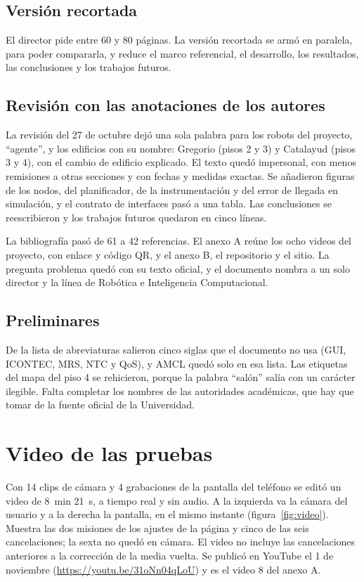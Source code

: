 \documentclass[12pt,letterpaper]{article}
\begin{document}
\subsection{Versión recortada}

El director pide entre 60 y 80 páginas. La versión recortada se armó en paralela, para poder compararla, y reduce el marco referencial, el desarrollo, los resultados, las conclusiones y los trabajos futuros.

\subsection{Revisión con las anotaciones de los autores}

La revisión del 27 de octubre dejó una sola palabra para los robots del proyecto, ``agente'', y los edificios con su nombre: Gregorio (pisos 2 y 3) y Catalayud (pisos 3 y 4), con el cambio de edificio explicado. El texto quedó impersonal, con menos remisiones a otras secciones y con fechas y medidas exactas. Se añadieron figuras de los nodos, del planificador, de la instrumentación y del error de llegada en simulación, y el contrato de interfaces pasó a una tabla. Las conclusiones se reescribieron y los trabajos futuros quedaron en cinco líneas.

La bibliografía pasó de 61 a 42 referencias. El anexo A reúne los ocho videos del proyecto, con enlace y código QR, y el anexo B, el repositorio y el sitio. La pregunta problema quedó con su texto oficial, y el documento nombra a un solo director y la línea de Robótica e Inteligencia Computacional.

\subsection{Preliminares}

De la lista de abreviaturas salieron cinco siglas que el documento no usa (GUI, ICONTEC, MRS, NTC y QoS), y AMCL quedó solo en esa lista. Las etiquetas del mapa del piso 4 se rehicieron, porque la palabra ``salón'' salía con un carácter ilegible. Falta completar los nombres de las autoridades académicas, que hay que tomar de la fuente oficial de la Universidad.

\section{Video de las pruebas}

Con 14 clips de cámara y 4 grabaciones de la pantalla del teléfono se editó un video de 8~min 21~s, a tiempo real y sin audio. A la izquierda va la cámara del usuario y a la derecha la pantalla, en el mismo instante (figura~\ref{fig:video}). Muestra las dos misiones de los ajustes de la página y cinco de las seis cancelaciones; la sexta no quedó en cámara. El video no incluye las cancelaciones anteriores a la corrección de la media vuelta. Se publicó en YouTube el 1 de noviembre (\url{https://youtu.be/31oNn04qLoU}) y es el video 8 del anexo A.
\end{document}
